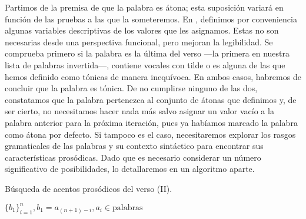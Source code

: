 Partimos de la premisa de que la palabra es átona; esta suposición variará en función de las pruebas a las que la someteremos. En , definimos por conveniencia algunas variables descriptivas de los valores que les asignamos. Estas no son necesarias desde una perspectiva funcional, pero mejoran la legibilidad. Se comprueba primero si la palabra es la última del verso —la primera en nuestra lista de palabras invertida—, contiene vocales con tilde o es alguna de las que hemos definido como  tónicas de manera inequívoca. En ambos casos, habremos de concluir que la palabra es tónica. De no cumplirse ninguno de las dos, constatamos que la palabra pertenezca al conjunto de átonas que definimos y, de ser cierto, no necesitamos hacer nada más salvo asignar un valor vacío a la palabra anterior para la próxima iteración, pues ya habíamos marcado la palabra como átona por defecto. Si tampoco es el caso, necesitaremos explorar los rasgos gramaticales de las palabras y su contexto sintáctico para encontrar sus características prosódicas. Dado que es necesario considerar un número significativo de posibilidades, lo detallaremos en un algoritmo aparte.

\begin{algorithm}[!ht]
	\caption{Búsqueda de acentos prosódicos del verso (II).}\label{list:findps2}
	\words \gets $\{b_1\}^n_{i=1}, b_1=a_{(n+1)-i}, a_i \in \text{palabras}$ \;
\end{algorithm}

